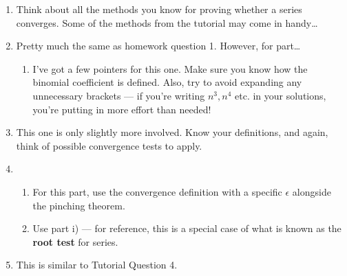 \documentclass[
  17pt,
  a4paper]{extarticle}
\providecommand{\tightlist}{%
  \setlength{\itemsep}{0pt}\setlength{\parskip}{0pt}}
\theoremstyle{plain}
\theoremstyle{definition}
\theoremstyle{plain}
\theoremstyle{plain}
\theoremstyle{plain}
\theoremstyle{plain}
\theoremstyle{definition}
\theoremstyle{definition}
\theoremstyle{remark}
\theoremstyle{remark}
\renewcommand{\;}{\,}
\begin{document}
\begin{enumerate}
\def\labelenumi{\arabic{enumi}.}
\item
  Think about all the methods you know for proving whether a series converges. Some of the methods from the tutorial may come in handy\ldots{}
\item
  Pretty much the same as homework question 1. However, for part\ldots{}

  \begin{enumerate}
  \def\labelenumii{\alph{enumii})}
  \setcounter{enumii}{1}
  \tightlist
  \item
    I've got a few pointers for this one. Make sure you know how the binomial coefficient is defined. Also, try to avoid expanding any unnecessary brackets --- if you're writing \(n^3, n^4\) etc. in your solutions, you're putting in more effort than needed!
  \end{enumerate}
\item
  This one is only slightly more involved. Know your definitions, and again, think of possible convergence tests to apply.
\item
  \begin{enumerate}
  \def\labelenumii{\roman{enumii})}
  \tightlist
  \item
    For this part, use the convergence definition with a specific \(\epsilon\) alongside the pinching theorem.
  \item
    Use part i) --- for reference, this is a special case of what is known as the \textbf{root test} for series.
  \end{enumerate}
\item
  This is similar to Tutorial Question 4.
\end{enumerate}
\end{document}
